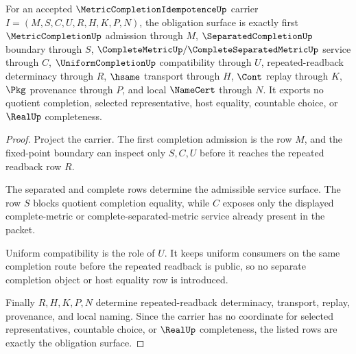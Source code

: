 \begin{theorem}
\label{thm:metric-completion-idempotence-obligation-scope}
For an accepted $\MetricCompletionIdempotenceUp$ carrier $I=(M,S,C,U,R,H,K,P,N)$, the obligation surface is exactly first $\MetricCompletionUp$ admission through $M$, $\SeparatedCompletionUp$ boundary through $S$, $\CompleteMetricUp/\CompleteSeparatedMetricUp$ service through $C$, $\UniformCompletionUp$ compatibility through $U$, repeated-readback determinacy through $R$, $\hsame$ transport through $H$, $\Cont$ replay through $K$, $\Pkg$ provenance through $P$, and local $\NameCert$ through $N$. It exports no quotient completion, selected representative, host equality, countable choice, or $\RealUp$ completeness.
\end{theorem}
\begin{proof}
Project the carrier. The first completion admission is the row $M$, and the fixed-point boundary can inspect only $S,C,U$ before it reaches the repeated readback row $R$.

The separated and complete rows determine the admissible service surface. The row $S$ blocks quotient completion equality, while $C$ exposes only the displayed complete-metric or complete-separated-metric service already present in the packet.

Uniform compatibility is the role of $U$. It keeps uniform consumers on the same completion route before the repeated readback is public, so no separate completion object or host equality row is introduced.

Finally $R,H,K,P,N$ determine repeated-readback determinacy, transport, replay, provenance, and local naming. Since the carrier has no coordinate for selected representatives, countable choice, or $\RealUp$ completeness, the listed rows are exactly the obligation surface.
\end{proof}

